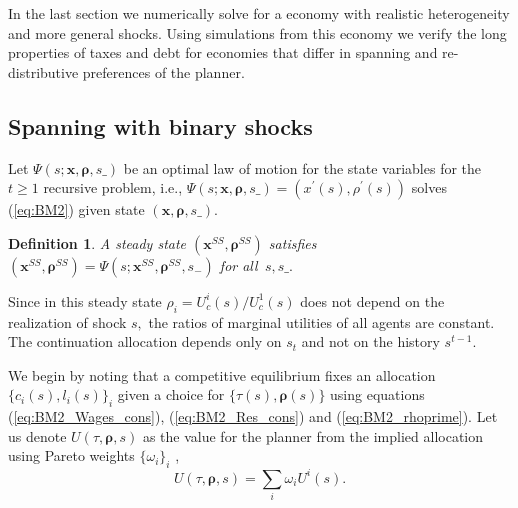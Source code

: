 \documentclass[11.5pt,twoside]{article}
\newtheorem{definition}{Definition}
\begin{document}
In the last section we numerically solve for a economy with realistic heterogeneity and more general shocks. Using simulations from this economy we verify the long properties of taxes and debt for economies that differ in spanning and re-distributive preferences of the planner. 
\subsection{Spanning with binary shocks}

Let $\Psi \left( s;\bm{x},\bm{\rho },s\_\right) $ be an optimal  law of motion for the state variables
for the $t\geq1$ recursive problem, i.e., $\Psi \left( s;\bm{x},%
\bm{\rho },s\_\right) =\left( x^{\prime }\left( s\right) ,\rho ^{\prime
}\left( s\right) \right) $  solves (\ref{eq:BM2}) given state $\left(
\bm{x},\bm{\rho },s\_\right) .$
\begin{definition}
 A steady state  $\left( \bm{x}^{SS},\bm{\rho} ^{SS}\right) $  satisfies $\left(\bm{ x}^{SS},\bm{\rho}
^{SS}\right) =\Psi \left( s;\bm{x}^{SS},\bm{\rho} ^{SS},s_{-}\right) $ for all $%
\,s,s\_.$
\end{definition}
Since in this steady state $\rho_i =U_{c}^{i}(s)/U_{c}^{1}(s)$ does
not depend on the realization of shock $s,$ the ratios of marginal utilities
of  all agents are constant. The continuation allocation depends only on  $s_{t}$ and not on the  history $s^{t-1}$.%

We  begin by noting that a competitive equilibrium fixes an allocation $\{c_i(s),l_i(s)\}_{i}$ given a choice for $\{\tau(s), \bm{\rho}(s)\}$ using equations (\ref{eq:BM2_Wages_cons}), (\ref{eq:BM2_Res_cons}) and (\ref{eq:BM2_rhoprime}).  Let us denote $U(\tau,\bm{\rho},s)$ as the value for the planner from the implied allocation using Pareto weights $\{\omega_i\}_i$ ,
\[U(\tau,\bm{\rho},s)=\sum_{i}\omega_i U^i(s).\]
\end{document}
